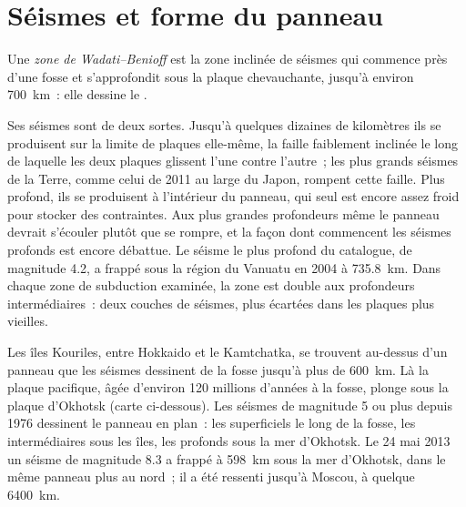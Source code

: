 \section{Séismes et forme du panneau}\label{sec:b1:active-margins:seismicity}

\begin{definition}\label{def:b1:active-margins:wadati-benioff}
Une \emph{zone de Wadati--Benioff} est la zone inclinée
de séismes qui commence près d'une fosse et s'approfondit sous la plaque chevauchante,
jusqu'à environ \qty{700}{km}~: elle dessine le .
\end{definition}

Ses séismes sont de deux sortes. Jusqu'à quelques dizaines de kilomètres ils se produisent sur
la limite de plaques elle-même, la faille faiblement inclinée le long de laquelle les deux plaques
glissent l'une contre l'autre~; les plus grands séismes de la Terre, comme celui de 2011
au large du Japon, rompent cette faille. Plus profond, ils se produisent à l'intérieur du panneau, qui seul est
encore assez froid pour stocker des contraintes. Aux plus grandes profondeurs même le panneau devrait
s'écouler plutôt que se rompre, et la façon dont commencent les séismes profonds est encore débattue. Le
séisme le plus profond du catalogue, de magnitude 4.2, a frappé sous la
région du Vanuatu en 2004 à \qty{735.8}{km}. Dans chaque zone de subduction examinée,
la zone est double aux profondeurs intermédiaires~: deux couches de séismes, plus
écartées dans les plaques plus vieilles.

Les îles Kouriles, entre Hokkaido et le Kamtchatka, se trouvent au-dessus d'un panneau que les
séismes dessinent de la fosse jusqu'à plus de \qty{600}{km}. Là la plaque pacifique, âgée d'environ 120 millions d'années
à la fosse, plonge sous la plaque d'Okhotsk
(carte ci-dessous). Les séismes de magnitude 5 ou plus depuis
1976 dessinent le panneau en plan~: les superficiels le long de la fosse, les intermédiaires
sous les îles, les profonds sous la mer d'Okhotsk. Le 24 mai 2013 un
séisme de magnitude 8.3 a frappé à \qty{598}{km} sous la mer d'Okhotsk,
dans le même panneau plus au nord~; il a été ressenti jusqu'à Moscou, à quelque
\qty{6400}{km}.

